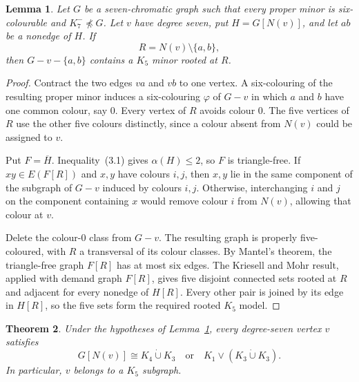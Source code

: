 \documentclass[11pt]{amsart}
\newtheorem{theorem}{Theorem}[section]
\newtheorem{lemma}[theorem]{Lemma}
\newcommand{\minor}{\preccurlyeq}
\newcommand{\N}{N}
\begin{document}
\begin{lemma}\label{lem:rooted-k5}
Let $G$ be a seven-chromatic graph such that every proper minor is
six-colourable and $K_7^{-}\not\minor G$.  Let $v$ have degree seven, put
$H=G[\N(v)]$, and let $ab$ be a nonedge of $H$.  If
\[
        R=\N(v)\setminus\{a,b\},
\]
then $G-v-\{a,b\}$ contains a $K_5$ minor rooted at $R$.
\end{lemma}

\begin{proof}
Contract the two edges $va$ and $vb$ to one vertex.  A six-colouring of
the resulting proper minor induces a six-colouring $\varphi$ of $G-v$ in
which $a$ and $b$ have one common colour, say $0$.  Every vertex of $R$
avoids colour $0$.  The five vertices of $R$ use the other five colours
distinctly, since a colour absent from $\N(v)$ could be assigned to $v$.

Put $F=\overline H$.  Inequality~(3.1) gives $\alpha(H)\leq2$, so $F$ is
triangle-free.  If $xy\in E(F[R])$ and $x,y$ have colours $i,j$, then
$x,y$ lie in the same component of the subgraph of $G-v$ induced by
colours $i,j$.  Otherwise, interchanging $i$ and $j$ on the component
containing $x$ would remove colour $i$ from $\N(v)$, allowing that colour
at $v$.

Delete the colour-$0$ class from $G-v$.  The resulting graph is properly
five-coloured, with $R$ a transversal of its colour classes.  By Mantel's
theorem, the triangle-free graph $F[R]$ has at most six edges.  The
Kriesell and Mohr result, applied with demand graph $F[R]$, gives five
disjoint connected sets rooted at $R$ and adjacent for every nonedge of
$H[R]$.  Every other pair is joined by its edge in $H[R]$, so the five
sets form the required rooted $K_5$ model.
\end{proof}

\begin{theorem}\label{thm:local-classification}
Under the hypotheses of Lemma~\ref{lem:rooted-k5}, every degree-seven
vertex $v$ satisfies
\[
        G[\N(v)]\cong K_4\mathbin{\dot\cup}K_3
        \quad\text{or}\quad
        K_1\vee(K_3\mathbin{\dot\cup}K_3).
                                                        \tag{3.2}
\]
In particular, $v$ belongs to a $K_5$ subgraph.
\end{theorem}
\end{document}
